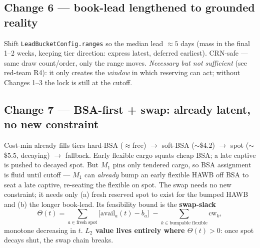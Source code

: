 \documentclass[11pt]{article}
\newcommand{\cw}{\mathrm{cw}}
\newcommand{\avail}{\mathrm{avail}}
\newcommand{\code}[1]{\texttt{#1}}
\begin{document}
\subsection{Change 6 --- book-lead lengthened to grounded reality}
Shift \code{LeadBucketConfig.ranges} so the median lead $\approx5$ days (mass in the final 1--2 weeks,
keeping tier direction: express latest, deferred earliest). CRN-safe --- same draw count/order, only the
range moves. \emph{Necessary but not sufficient} (see red-team R4): it only creates the \emph{window} in
which reserving can act; without Changes 1--3 the lock is still at the cutoff.

\subsection{Change 7 --- BSA-first + swap: already latent, no new constraint}
Cost-min already fills tiers hard-BSA ($\approx$free) $\to$ soft-BSA ($\sim$\$4.2) $\to$ spot
($\sim$\$5.5, decaying) $\to$ fallback. Early flexible cargo squats cheap BSA; a late captive is pushed to
decayed spot. But $M_1$ pins only tendered cargo, so BSA assignment is fluid until cutoff --- $M_1$ can
\emph{already} bump an early flexible HAWB off BSA to seat a late captive, re-seating the flexible on spot.
The swap needs no new constraint; it needs only (a) fresh reserved spot to exist for the bumped HAWB and
(b) the longer book-lead. Its feasibility bound is the \textbf{swap-slack}
\begin{equation}\label{eq:theta}
\Theta(t)=\sum_{a\in\text{fresh spot}}\!\!\bigl[\avail_a(t)-b_a\bigr]\;-\!\!\sum_{k\in\text{bumpable flexible}}\!\!\cw_k,
\end{equation}
monotone decreasing in $t$. \textbf{$L_2$ value lives entirely where $\Theta(t)>0$}: once spot decays shut,
the swap chain breaks.
\end{document}
